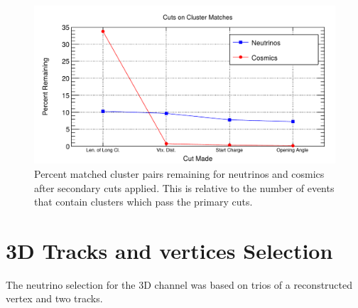 \begin{figure}[htp!]
\centering
\includegraphics[width=\textwidth]{figs/2dsecondarycut.png}
\caption{Percent matched cluster pairs remaining for neutrinos and cosmics after secondary cuts applied. This is relative to the number of events that contain clusters which pass the primary cuts.}
\label{fig:2dsecondarycuts}
\end{figure}

\section{3D Tracks and vertices Selection}
The neutrino selection for the 3D channel was based on trios of a reconstructed vertex and two tracks. 
